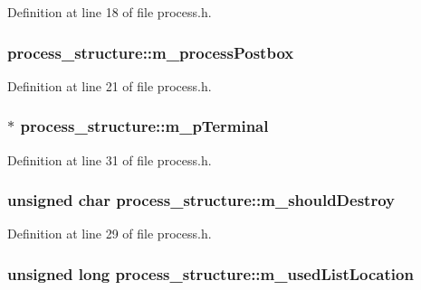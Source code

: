 Definition at line 18 of file process.h.

\hypertarget{structprocess__structure_a158668d142ff732572d4b738a0b7ba90}{
\subsubsection[{m\_\-processPostbox}]{ {\bf process\_\-structure::m\_\-processPostbox}}}
\label{structprocess__structure_a158668d142ff732572d4b738a0b7ba90}


Definition at line 21 of file process.h.

\hypertarget{structprocess__structure_a542c418055252b7dedef0c3589f322ca}{
\subsubsection[{m\_\-pTerminal}]{$\ast$ {\bf process\_\-structure::m\_\-pTerminal}}}
\label{structprocess__structure_a542c418055252b7dedef0c3589f322ca}


Definition at line 31 of file process.h.

\hypertarget{structprocess__structure_a3157fc938c803c37b84700905aadff90}{
\subsubsection[{m\_\-shouldDestroy}]{\setlength{\rightskip}{0pt plus 5cm}unsigned char {\bf process\_\-structure::m\_\-shouldDestroy}}}
\label{structprocess__structure_a3157fc938c803c37b84700905aadff90}


Definition at line 29 of file process.h.

\hypertarget{structprocess__structure_ab2dc0a220465f2bda420ac4cc053d88b}{
\subsubsection[{m\_\-usedListLocation}]{\setlength{\rightskip}{0pt plus 5cm}unsigned long {\bf process\_\-structure::m\_\-usedListLocation}}}
\label{structprocess__structure_ab2dc0a220465f2bda420ac4cc053d88b}


